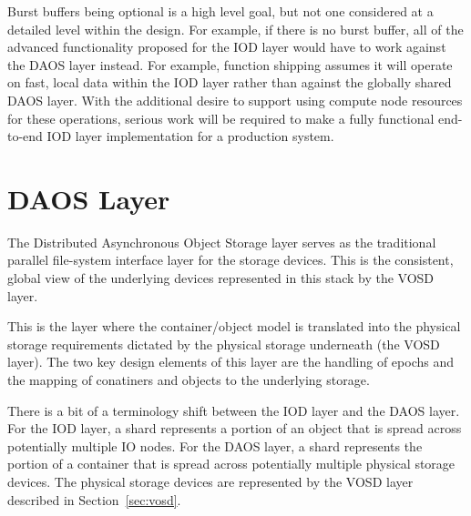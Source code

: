 \documentclass[conference]{IEEEtran}
\begin{document}
Burst buffers being optional is a high level goal, but not one considered at a
detailed level within the design. For example, if there is no burst buffer, all
of the advanced functionality proposed for the IOD layer would have to work
against the DAOS layer instead. For example, function shipping assumes it will
operate on fast, local data within the IOD layer rather than against the
globally shared DAOS layer. With the additional desire to support using compute
node resources for these operations, serious work will be required to make a
fully functional end-to-end IOD layer implementation for a production system.


\section{DAOS Layer}
\label{sec:daos}

The Distributed Asynchronous Object Storage layer serves as the traditional
parallel file-system interface layer for the storage devices. This is the
consistent, global view of the underlying devices represented in this stack
by the VOSD layer.

This is the layer where the container/object model is translated into the
physical storage requirements dictated by the physical storage underneath (the
VOSD layer). The two key design elements of this layer are the handling of
epochs and the mapping of conatiners and objects to the underlying storage.

There is a bit of a terminology shift between the IOD layer and the DAOS
layer. For the IOD layer, a shard represents a portion of an object that is
spread across potentially multiple IO nodes. For the DAOS layer, a shard
represents the portion of a container that is spread across potentially
multiple physical storage devices. The physical storage devices are represented
by the VOSD layer described in Section~\ref{sec:vosd}.
\end{document}
